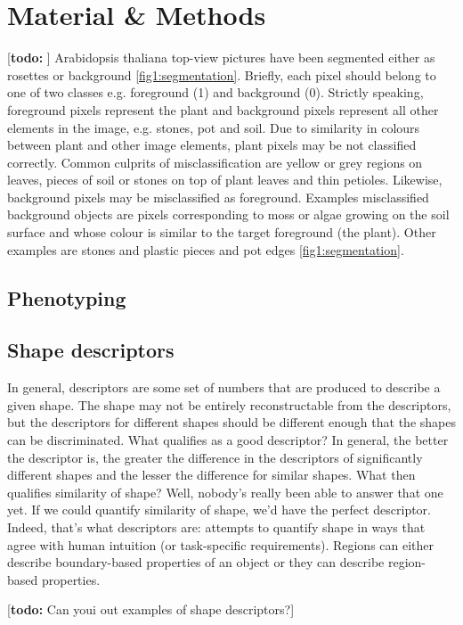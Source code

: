 \documentclass{frontiersSCNS} %
\newcommand{\todo}[1]{
  \rule{0pt}{0pt}\marginpar{{\color{blue}\rule{1ex}{1ex}}}
  {[\textbf{\color{blue}todo:} #1]}}
\begin{document}
\section{Material \& Methods}

\todo{}
Arabidopsis thaliana top-view pictures have been segmented either as rosettes or background \ref{fig1:segmentation}. Briefly, each pixel should belong to one of two classes e.g. foreground (1) and background (0). Strictly speaking, foreground pixels represent the plant and background pixels represent all other elements in the image, e.g. stones, pot and soil. Due to similarity in colours between plant and other image elements, plant pixels may be not classified correctly. Common culprits of misclassification are yellow or grey regions on leaves, pieces of soil or stones on top of plant leaves and thin petioles. Likewise, background pixels may be misclassified as foreground. Examples misclassified background objects are pixels corresponding to moss or algae growing on the soil surface and whose colour is similar to the target foreground (the plant). Other examples are stones and plastic pieces and pot edges \ref{fig1:segmentation}.

\subsection{Phenotyping}


\subsection{Shape descriptors}

In general, descriptors are some set of numbers that are produced to describe a given shape. The shape may not be
entirely reconstructable from the descriptors, but the descriptors for different shapes should be different enough that
the shapes can be discriminated.
What qualifies as a good descriptor? In general, the better the descriptor is, the greater the difference in the descriptors
of significantly different shapes and the lesser the difference for similar shapes. What then qualifies similarity
of shape? Well, nobody’s really been able to answer that one yet. If we could quantify similarity of shape, we’d have
the perfect descriptor. Indeed, that’s what descriptors are: attempts to quantify shape in ways that agree with human
intuition (or task-specific requirements). Regions can either describe boundary-based properties of an object or they can describe region-based properties. 
 \cite{}
\todo{Can youi out examples of shape descriptors?}
\end{document}

